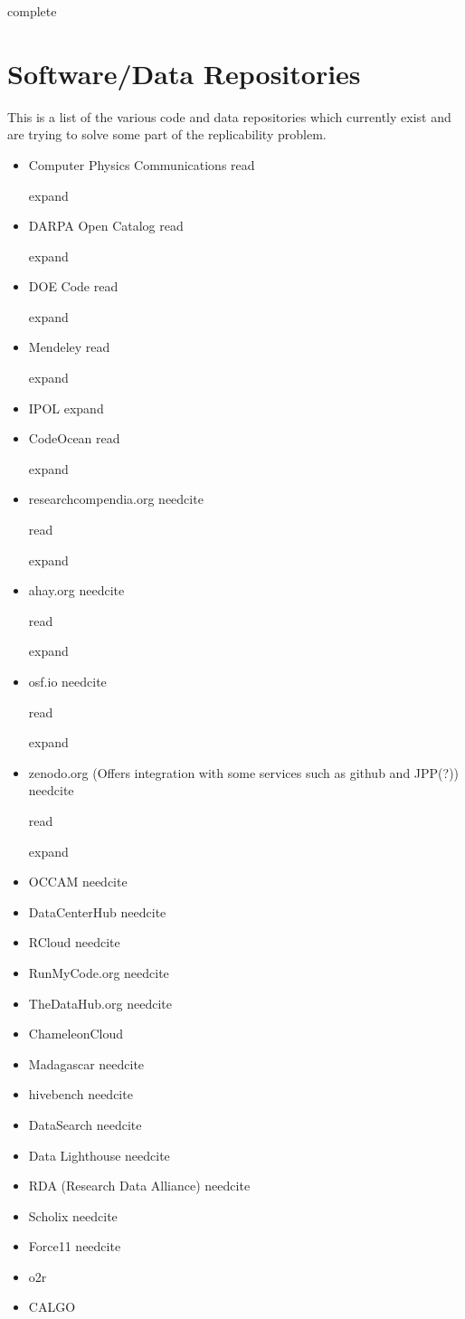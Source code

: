 \documentclass[american]{article}
\newcommand{\Read}{
	\gls{read}
}
\newcommand{\complete}{
	\gls{complete}
}
\newcommand{\needcite}{
	\gls{needcite}
}
\newcommand{\expand}{
	\gls{expand}
}
\begin{document}
\complete

\section{Software/Data Repositories} \label{sec:repositories}

This is a list of the various code and data repositories which currently exist and are trying to solve some part of the replicability problem.

\begin{itemize}
\item Computer Physics Communications \cite{computer-physics-communications} \Read \expand
\item DARPA Open Catalog \cite{darpa-open-catalog} \Read \expand
\item DOE Code \cite{doe-code} \Read \expand
\item Mendeley \cite{elsevier-mendeley-computer-physics-communications} \Read \expand
\item IPOL \cite{ipol-website} \expand
\item CodeOcean \cite{codeocean-live} \Read \expand
\item researchcompendia.org \needcite \Read \expand
\item ahay.org \needcite \Read \expand
\item osf.io \needcite \Read \expand
\item zenodo.org (Offers integration with some services such as github and JPP(?)) \needcite \Read \expand
\item OCCAM \needcite
\item DataCenterHub \needcite
\item RCloud \needcite
\item RunMyCode.org \needcite
\item TheDataHub.org \needcite
\item ChameleonCloud \cite{chameleon-cloud}
\item Madagascar \needcite
\item hivebench \needcite
\item DataSearch \needcite
\item Data Lighthouse \needcite
\item RDA (Research Data Alliance) \needcite
\item Scholix \needcite
\item Force11 \needcite
\item o2r \cite{o2r-platform}
\item CALGO \cite{calgo}
\end{itemize}
\end{document}
